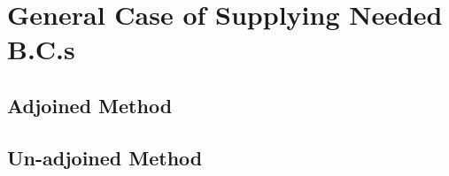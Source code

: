 \section{General Case of Supplying Needed B.C.s}

\subsection{Adjoined Method}

\subsection{Un-adjoined Method}